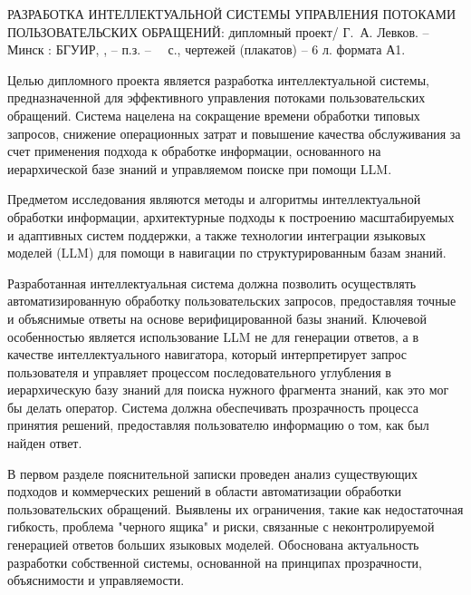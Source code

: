 \thispagestyle{empty}

\MakeUppercase{Разработка интеллектуальной системы управления потоками пользовательских обращений}: дипломный проект/ Г.~А. Левков. -- Минск : БГУИР, \the\year{}, -- п.з. -- ~\pageref*{LastPage}~с., чертежей (плакатов) -- 6 л. формата А1.

\vspace{4\parsep}


Целью дипломного проекта является разработка интеллектуальной системы, предназначенной для эффективного управления потоками пользовательских обращений. Система нацелена на сокращение времени обработки типовых запросов, снижение операционных затрат и повышение качества обслуживания за счет применения подхода к обработке информации, основанного на иерархической базе знаний и управляемом поиске при помощи LLM.

Предметом исследования являются методы и алгоритмы интеллектуальной обработки информации, архитектурные подходы к построению масштабируемых и адаптивных систем поддержки, а также технологии интеграции языковых моделей (LLM) для помощи в навигации по структурированным базам знаний.

Разработанная интеллектуальная система должна позволить осуществлять автоматизированную обработку пользовательских запросов, предоставляя точные и объяснимые ответы на основе верифицированной базы знаний. Ключевой особенностью является использование LLM не для генерации ответов, а в качестве интеллектуального навигатора, который интерпретирует запрос пользователя и управляет процессом последовательного углубления в иерархическую базу знаний для поиска нужного фрагмента знаний, как это мог бы делать оператор. Система должна обеспечивать прозрачность процесса принятия решений, предоставляя пользователю информацию о том, как был найден ответ.

В первом разделе пояснительной записки проведен анализ существующих подходов и коммерческих решений в области автоматизации обработки пользовательских обращений. Выявлены их ограничения, такие как недостаточная гибкость, проблема "черного ящика" и риски, связанные с неконтролируемой генерацией ответов больших языковых моделей. Обоснована актуальность разработки собственной системы, основанной на принципах прозрачности, объяснимости и управляемости.

